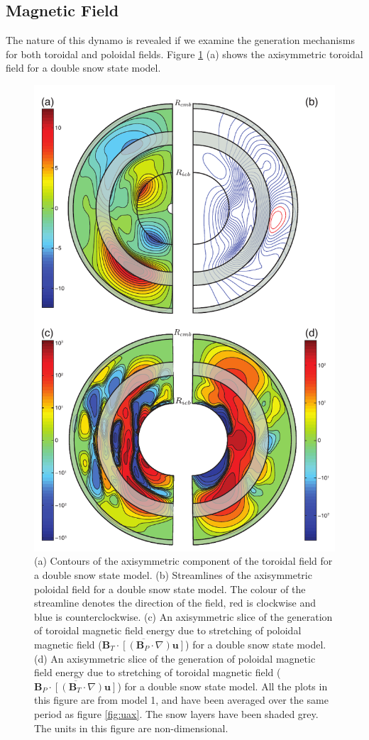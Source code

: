 \subsection{Magnetic Field}
The nature of this dynamo is revealed if we examine the generation mechanisms for both toroidal and poloidal fields. Figure \ref{fig:maggen} (a) shows the axisymmetric toroidal field for a double snow state model.
%
\begin{figure}
	\centering
	\noindent\includegraphics[width=.7\linewidth]{Chapter4/figures/aximaggen}
	\caption{(a) Contours of the axisymmetric component of the toroidal field for a double snow state model. (b) Streamlines of the axisymmetric poloidal field for a double snow state model. The colour of the streamline denotes the direction of the field, red is clockwise and blue is counterclockwise. (c) An axisymmetric slice of the generation of toroidal magnetic field energy due to stretching of poloidal magnetic field ($\overline{\mathbf{B}_{T}\cdot\left[\left(\mathbf{B}_{P}\cdot\nabla\right)\mathbf{u}\right]}$) for a double snow state model. (d) An axisymmetric slice of the generation of poloidal magnetic field energy due to stretching of toroidal magnetic field ($\overline{\mathbf{B}_{P}\cdot\left[\left(\mathbf{B}_{T}\cdot\nabla\right)\mathbf{u}\right]}$) for a double snow state model. All the plots in this figure are from model 1, and have been averaged over the same period as figure \ref{fig:uax}. The snow layers have been shaded grey. The units in this figure are non-dimensional.}
	\label{fig:maggen}
\end{figure}
